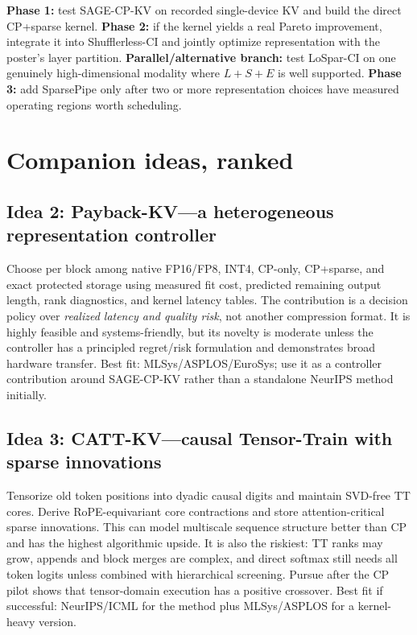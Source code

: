 \documentclass[10pt]{article}
\begin{document}
\begin{keybox}[title={Recommended sequence}]
\textbf{Phase 1:} test SAGE-CP-KV on recorded single-device KV and build the direct CP+sparse
kernel. \textbf{Phase 2:} if the kernel yields a real Pareto improvement, integrate it into
Shufflerless-CI and jointly optimize representation with the poster's layer partition.
\textbf{Parallel/alternative branch:} test LoSpar-CI on one genuinely high-dimensional modality
where $L+S+E$ is well supported. \textbf{Phase 3:} add SparsePipe only after two or more
representation choices have measured operating regions worth scheduling.
\end{keybox}

\section{Companion ideas, ranked}

\subsection{Idea 2: Payback-KV---a heterogeneous representation controller}

Choose per block among native FP16/FP8, INT4, CP-only, CP+sparse, and exact protected storage using
measured fit cost, predicted remaining output length, rank diagnostics, and kernel latency tables.
The contribution is a decision policy over \emph{realized latency and quality risk}, not another
compression format. It is highly feasible and systems-friendly, but its novelty is moderate unless
the controller has a principled regret/risk formulation and demonstrates broad hardware transfer.
Best fit: MLSys/ASPLOS/EuroSys; use it as a controller contribution around SAGE-CP-KV rather than a
standalone NeurIPS method initially.

\subsection{Idea 3: CATT-KV---causal Tensor-Train with sparse innovations}

Tensorize old token positions into dyadic causal digits and maintain SVD-free TT cores. Derive
RoPE-equivariant core contractions and store attention-critical sparse innovations. This can model
multiscale sequence structure better than CP and has the highest algorithmic upside. It is also
the riskiest: TT ranks may grow, appends and block merges are complex, and direct softmax still
needs all token logits unless combined with hierarchical screening. Pursue after the CP pilot shows
that tensor-domain execution has a positive crossover. Best fit if successful: NeurIPS/ICML for
the method plus MLSys/ASPLOS for a kernel-heavy version.
\end{document}
